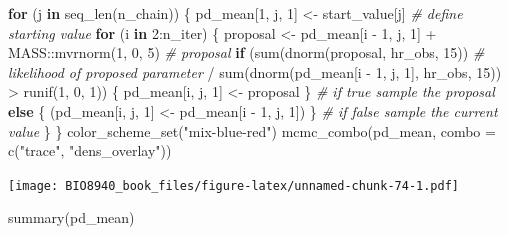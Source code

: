 \documentclass[
  12pt,
]{book}
\newenvironment{Shaded}{\begin{snugshade}}{\end{snugshade}}
\newcommand{\AttributeTok}[1]{\textcolor[rgb]{0.77,0.63,0.00}{#1}}
\newcommand{\CommentTok}[1]{\textcolor[rgb]{0.56,0.35,0.01}{\textit{#1}}}
\newcommand{\ControlFlowTok}[1]{\textcolor[rgb]{0.13,0.29,0.53}{\textbf{#1}}}
\newcommand{\DecValTok}[1]{\textcolor[rgb]{0.00,0.00,0.81}{#1}}
\newcommand{\FunctionTok}[1]{\textcolor[rgb]{0.00,0.00,0.00}{#1}}
\newcommand{\NormalTok}[1]{#1}
\newcommand{\OtherTok}[1]{\textcolor[rgb]{0.56,0.35,0.01}{#1}}
\newcommand{\SpecialCharTok}[1]{\textcolor[rgb]{0.00,0.00,0.00}{#1}}
\newcommand{\StringTok}[1]{\textcolor[rgb]{0.31,0.60,0.02}{#1}}
\begin{document}
\begin{Shaded}
\begin{Highlighting}[]
\ControlFlowTok{for}\NormalTok{ (j }\ControlFlowTok{in} \FunctionTok{seq\_len}\NormalTok{(n\_chain)) \{}
\NormalTok{  pd\_mean[}\DecValTok{1}\NormalTok{, j, }\DecValTok{1}\NormalTok{] }\OtherTok{\textless{}{-}}\NormalTok{ start\_value[j] }\CommentTok{\# define starting value}
  \ControlFlowTok{for}\NormalTok{ (i }\ControlFlowTok{in} \DecValTok{2}\SpecialCharTok{:}\NormalTok{n\_iter) \{}
\NormalTok{    proposal }\OtherTok{\textless{}{-}}\NormalTok{ pd\_mean[i }\SpecialCharTok{{-}} \DecValTok{1}\NormalTok{, j, }\DecValTok{1}\NormalTok{] }\SpecialCharTok{+}\NormalTok{ MASS}\SpecialCharTok{::}\FunctionTok{mvrnorm}\NormalTok{(}\DecValTok{1}\NormalTok{, }\DecValTok{0}\NormalTok{, }\DecValTok{5}\NormalTok{) }\CommentTok{\# proposal}
    \ControlFlowTok{if}\NormalTok{ (}\FunctionTok{sum}\NormalTok{(}\FunctionTok{dnorm}\NormalTok{(proposal, hr\_obs, }\DecValTok{15}\NormalTok{)) }\CommentTok{\# likelihood of proposed parameter}
    \SpecialCharTok{/} \FunctionTok{sum}\NormalTok{(}\FunctionTok{dnorm}\NormalTok{(pd\_mean[i }\SpecialCharTok{{-}} \DecValTok{1}\NormalTok{, j, }\DecValTok{1}\NormalTok{], hr\_obs, }\DecValTok{15}\NormalTok{)) }\SpecialCharTok{\textgreater{}} \FunctionTok{runif}\NormalTok{(}\DecValTok{1}\NormalTok{, }\DecValTok{0}\NormalTok{, }\DecValTok{1}\NormalTok{)) \{}
\NormalTok{      pd\_mean[i, j, }\DecValTok{1}\NormalTok{] }\OtherTok{\textless{}{-}}\NormalTok{ proposal}
\NormalTok{    \} }\CommentTok{\# if true sample the proposal}
    \ControlFlowTok{else}\NormalTok{ \{}
\NormalTok{      (pd\_mean[i, j, }\DecValTok{1}\NormalTok{] }\OtherTok{\textless{}{-}}\NormalTok{ pd\_mean[i }\SpecialCharTok{{-}} \DecValTok{1}\NormalTok{, j, }\DecValTok{1}\NormalTok{])}
\NormalTok{    \} }\CommentTok{\# if false sample the current value}
\NormalTok{  \}}
\NormalTok{\}}
\FunctionTok{color\_scheme\_set}\NormalTok{(}\StringTok{"mix{-}blue{-}red"}\NormalTok{)}
\FunctionTok{mcmc\_combo}\NormalTok{(pd\_mean, }\AttributeTok{combo =} \FunctionTok{c}\NormalTok{(}\StringTok{"trace"}\NormalTok{, }\StringTok{"dens\_overlay"}\NormalTok{))}
\end{Highlighting}
\end{Shaded}

\texttt{[image: BIO8940\_book\_files/figure-latex/unnamed-chunk-74-1.pdf]}

\begin{Shaded}
\begin{Highlighting}[]
\FunctionTok{summary}\NormalTok{(pd\_mean)}
\end{Highlighting}
\end{Shaded}
\end{document}
